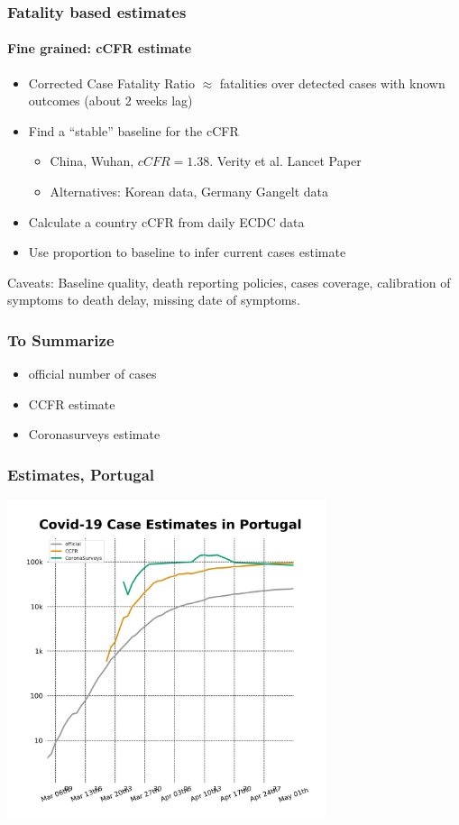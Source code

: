 \documentclass{beamer}
\begin{document}
\begin{frame}
  \frametitle{Fatality based estimates}
  \framesubtitle{Fine grained: cCFR estimate}
  \begin{itemize}
    \item Corrected Case Fatality Ratio $\approx$ fatalities over detected cases with known outcomes (about 2 weeks lag)
    \item Find a ``stable'' baseline for the cCFR 
      \begin{itemize}
        \item China, Wuhan, $cCFR=1.38$.  Verity et al. Lancet Paper 
        \item Alternatives: Korean data, Germany Gangelt data
      \end{itemize}
    \item Calculate a country cCFR from daily ECDC data 
    \item Use proportion to baseline to infer current cases estimate
  \end{itemize} \pause

  Caveats: Baseline quality, death reporting policies, cases coverage, calibration of symptoms to death delay, missing date of symptoms.
\end{frame}

\begin{frame}
\frametitle{To Summarize}
\begin{itemize}
\item official number of cases
\item CCFR estimate
\item Coronasurveys estimate
\end{itemize}
\end{frame}

\begin{frame}
  \frametitle{Estimates, Portugal}
  \begin{center}
  \includegraphics[width=0.7\textwidth]{estimatesPT.jpg}
  \end{center}
\end{frame}
\end{document}
